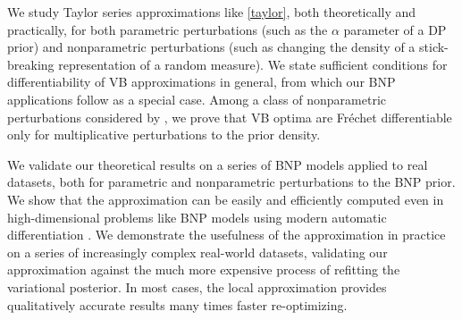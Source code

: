 We study Taylor series approximations like \eqref{taylor}, both theoretically
and practically, for both parametric perturbations (such as the $\alpha$
parameter of a DP prior) and nonparametric perturbations (such as changing
the density of a stick-breaking representation of a random measure).
We state sufficient conditions for differentiability of VB approximations
in general, from which our BNP applications follow as a special case.
Among a class of nonparametric perturbations considered by
\citet{gustafson:1996:local}, we prove that VB optima are Fr{\'e}chet
differentiable only for multiplicative perturbations to the prior density.

We validate our theoretical results on a series of BNP models applied to real
datasets, both for parametric and nonparametric perturbations to the BNP prior.
We show that the approximation can be easily and efficiently computed even in
high-dimensional problems like BNP models using modern automatic
differentiation \citep{baydin:2018:automatic, jax2018github}. We
demonstrate the usefulness of the approximation in practice on a series of
increasingly complex real-world datasets, validating our approximation against
the much more expensive process of refitting the variational posterior.   In
most cases, the local approximation provides qualitatively accurate results many
times faster re-optimizing.

